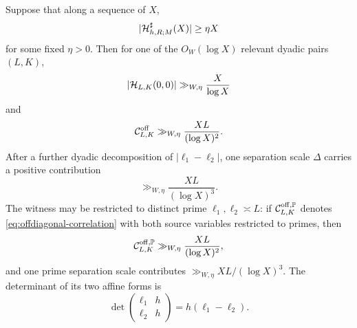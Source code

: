 \begin{corollary}
\label{cor:failed-gate-witness}
Suppose that along a sequence of $X$,
\begin{equation}
 |\mathcal H^\sharp_{h,R;M}(X)|\ge\eta X
 \label{eq:failed-total-gate}
\end{equation}
for some fixed $\eta>0$.  Then for one of the $O_W(\log X)$ relevant
dyadic pairs $(L,K)$,
\begin{equation}
 |\mathcal H_{L,K}(0,0)|\gg_{W,\eta}\frac X{\log X}
 \label{eq:dyadic-zero-witness}
\end{equation}
and
\begin{equation}
 \mathcal C^{\mathrm{off}}_{L,K}
 \gg_{W,\eta}\frac{XL}{(\log X)^2}.
 \label{eq:dyadic-ttstar-witness}
\end{equation}
After a further dyadic decomposition of
$|\ell_1-\ell_2|$, one separation scale $\Delta$ carries a positive
contribution
\begin{equation}
 \gg_{W,\eta}\frac{XL}{(\log X)^3}.
 \label{eq:separation-scale-witness}
\end{equation}
The witness may be restricted to distinct prime
$\ell_1,\ell_2\asymp L$: if
$\mathcal C^{\mathrm{off},\mathbb P}_{L,K}$ denotes
\eqref{eq:offdiagonal-correlation} with both source variables restricted
to primes, then
\begin{equation}
 \mathcal C^{\mathrm{off},\mathbb P}_{L,K}
 \gg_{W,\eta}\frac{XL}{(\log X)^2},
 \label{eq:prime-restricted-ttstar-witness}
\end{equation}
and one prime separation scale contributes
$\gg_{W,\eta}XL/(\log X)^3$.  The determinant of its two affine forms is
\begin{equation}
 \det\begin{pmatrix}\ell_1&h\\\ell_2&h\end{pmatrix}
 =h(\ell_1-\ell_2).
 \label{eq:two-form-determinant}
\end{equation}
\end{corollary}

